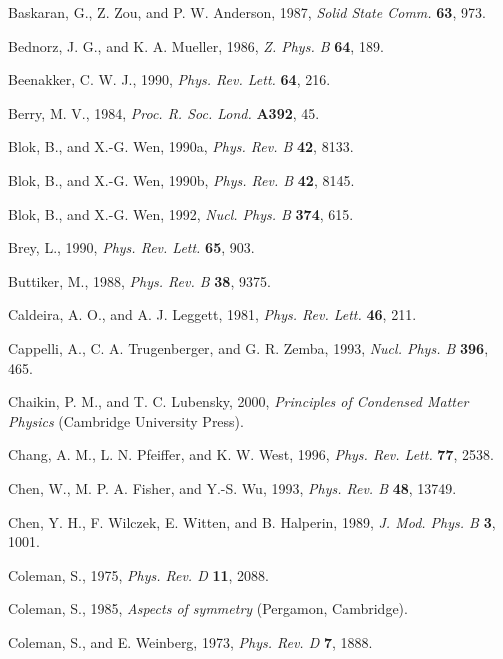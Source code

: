 \begin{list}{}{\setlength{\leftmargin}{2em}\setlength{\itemindent}{-2em}}
\item Baskaran, G., Z. Zou, and P. W. Anderson, 1987, \emph{Solid State Comm.} \textbf{63}, 973.
\item Bednorz, J. G., and K. A. Mueller, 1986, \emph{Z. Phys. B} \textbf{64}, 189.
\item Beenakker, C. W. J., 1990, \emph{Phys. Rev. Lett.} \textbf{64}, 216.
\item Berry, M. V., 1984, \emph{Proc. R. Soc. Lond.} \textbf{A392}, 45.
\item Blok, B., and X.-G. Wen, 1990a, \emph{Phys. Rev. B} \textbf{42}, 8133.
\item Blok, B., and X.-G. Wen, 1990b, \emph{Phys. Rev. B} \textbf{42}, 8145.
\item Blok, B., and X.-G. Wen, 1992, \emph{Nucl. Phys. B} \textbf{374}, 615.
\item Brey, L., 1990, \emph{Phys. Rev. Lett.} \textbf{65}, 903.
\item Buttiker, M., 1988, \emph{Phys. Rev. B} \textbf{38}, 9375.
\item Caldeira, A. O., and A. J. Leggett, 1981, \emph{Phys. Rev. Lett.} \textbf{46}, 211.
\item Cappelli, A., C. A. Trugenberger, and G. R. Zemba, 1993, \emph{Nucl. Phys. B} \textbf{396}, 465.
\item Chaikin, P. M., and T. C. Lubensky, 2000, \emph{Principles of Condensed Matter Physics} (Cambridge University Press).
\item Chang, A. M., L. N. Pfeiffer, and K. W. West, 1996, \emph{Phys. Rev. Lett.} \textbf{77}, 2538.
\item Chen, W., M. P. A. Fisher, and Y.-S. Wu, 1993, \emph{Phys. Rev. B} \textbf{48}, 13749.
\item Chen, Y. H., F. Wilczek, E. Witten, and B. Halperin, 1989, \emph{J. Mod. Phys. B} \textbf{3}, 1001.
\item Coleman, S., 1975, \emph{Phys. Rev. D} \textbf{11}, 2088.
\item Coleman, S., 1985, \emph{Aspects of symmetry} (Pergamon, Cambridge).
\item Coleman, S., and E. Weinberg, 1973, \emph{Phys. Rev. D} \textbf{7}, 1888.


\end{list}
